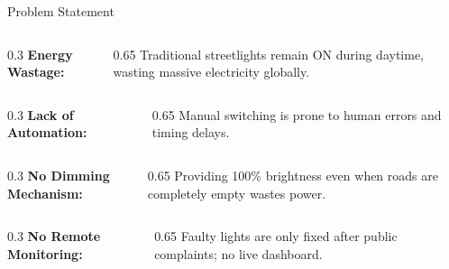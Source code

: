 \documentclass[aspectratio=169]{beamer}
\begin{document}
\begin{frame}{Problem Statement}
    \begin{columns}[T]
        \begin{column}{0.3\textwidth}
            \textbf{Energy Wastage:}
        \end{column}
        \begin{column}{0.65\textwidth}
            Traditional streetlights remain ON during daytime, wasting massive electricity globally.
        \end{column}
    \end{columns}
    \vspace{0.4cm}
    \begin{columns}[T]
        \begin{column}{0.3\textwidth}
            \textbf{Lack of Automation:}
        \end{column}
        \begin{column}{0.65\textwidth}
            Manual switching is prone to human errors and timing delays.
        \end{column}
    \end{columns}
    \vspace{0.4cm}
    \begin{columns}[T]
        \begin{column}{0.3\textwidth}
            \textbf{No Dimming Mechanism:}
        \end{column}
        \begin{column}{0.65\textwidth}
            Providing 100\% brightness even when roads are completely empty wastes power.
        \end{column}
    \end{columns}
    \vspace{0.4cm}
    \begin{columns}[T]
        \begin{column}{0.3\textwidth}
            \textbf{No Remote Monitoring:}
        \end{column}
        \begin{column}{0.65\textwidth}
            Faulty lights are only fixed after public complaints; no live dashboard.
        \end{column}
    \end{columns}
\end{frame}
\end{document}
